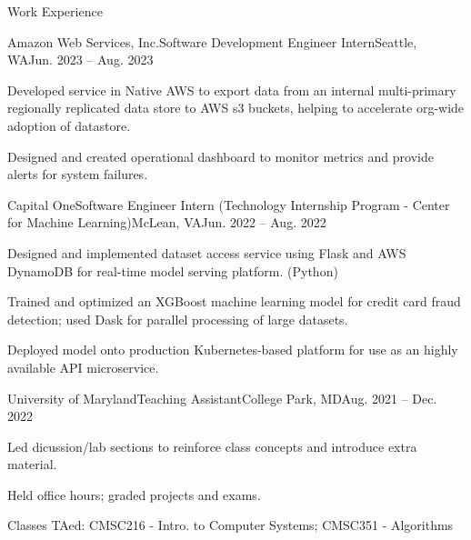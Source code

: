 \documentclass{article}
\newlength{\tabin}
\newlength{\secsep}
\newcommand{\lineunder}{\vspace*{-8pt} \\ \hspace*{-6pt} \hrulefill \\ \vspace*{-15pt}}
\newenvironment{tabbedsection}[1]{
  \begin{list}{}{
      \setlength{\itemsep}{0pt}
      \setlength{\labelsep}{0pt}
      \setlength{\labelwidth}{0pt}
      \setlength{\leftmargin}{\tabin}
      \setlength{\rightmargin}{\tabin}
      \setlength{\listparindent}{0pt}
      \setlength{\parsep}{0pt}
      \setlength{\parskip}{0pt}
      \setlength{\partopsep}{0pt}
      \setlength{\topsep}{#1}
    }
  \item[]
}{\end{list}}
\newenvironment{resume_section}[1]{
  \filbreak
  \vspace{2\secsep}
  \textsc{\large#1}
  \lineunder
  \begin{tabbedsection}{\secsep}
}{\end{tabbedsection}}
\newenvironment{subitems}{
  \renewcommand{\labelitemi}{-}
  \begin{itemize}
      \setlength{\labelsep}{1em}
}{\end{itemize}}
\newenvironment{resume_employer}[4]{
  \vspace{\secsep}
  \textbf{#1} \\ 
  \indent {\small #2} \hfill {\footnotesize#3 (#4)} \hspace{-4em}
  \begin{tabbedsection}{0pt}
  \begin{subitems}
}{\end{subitems}\end{tabbedsection}}
\begin{document}
\begin{resume_section}{Work Experience}
\begin{resume_employer}{Amazon Web Services, Inc.}{Software Development Engineer Intern}{Seattle, WA}{Jun. 2023 -- Aug. 2023}
	\item Developed service in Native AWS to export data from an internal multi-primary regionally replicated data store to
	AWS s3 buckets, helping to accelerate org-wide adoption of datastore.
  \item Designed and created operational dashboard to monitor metrics and provide alerts for system failures.
\end{resume_employer}
\begin{resume_employer}{Capital One}{Software Engineer Intern (Technology Internship Program - Center for Machine Learning)}{McLean, VA}{Jun. 2022 -- Aug. 2022}
	\item Designed and implemented dataset access service using Flask and AWS DynamoDB for real-time model serving platform. (Python)
	\item Trained and optimized an XGBoost machine learning model for credit card fraud detection; used Dask for parallel processing of large datasets. 
	\item Deployed model onto production Kubernetes-based platform for use as an highly available API microservice.
\end{resume_employer}
\begin{resume_employer}{University of Maryland}{Teaching Assistant}{College Park, MD}{Aug. 2021 -- Dec. 2022}
  \item Led dicussion/lab sections to reinforce class concepts and introduce extra material.
  \item Held office hours; graded projects and exams.
	\item Classes TAed: CMSC216 - Intro. to Computer Systems; CMSC351 - Algorithms

  

\end{resume_employer}
\end{resume_section}
\end{document}
